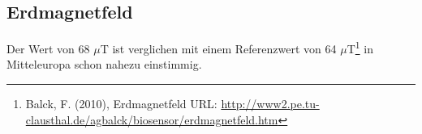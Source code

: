\subsection{Erdmagnetfeld}
Der Wert von 68 $\mu$T ist verglichen mit einem Referenzwert von 64 $\mu$T\footnote[2]{Balck, F. (2010), Erdmagnetfeld URL: \href{http://www2.pe.tu-clausthal.de/agbalck/biosensor/erdmagnetfeld.htm}{http://www2.pe.tu-clausthal.de/agbalck/biosensor/erdmagnetfeld.htm}} in Mitteleuropa schon nahezu einstimmig.





